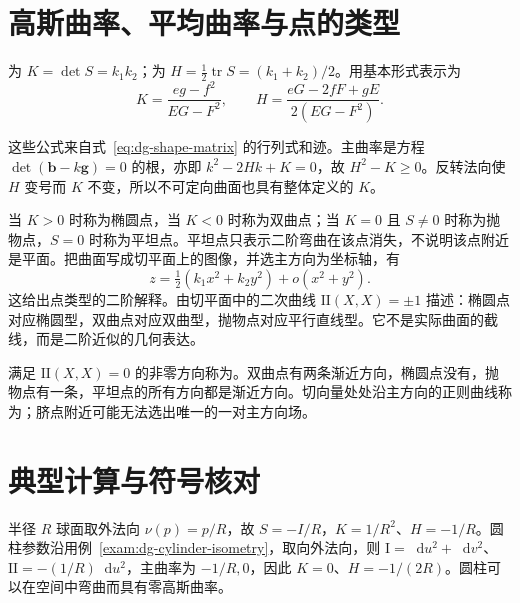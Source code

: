 \documentclass[UTF8,12pt,a4paper,fontset=fandol]{ctexbook}
\newcommand{\dd}{\mathop{}\!\mathrm d}
\DeclareMathOperator{\tr}{tr}
\begin{document}
\section{高斯曲率、平均曲率与点的类型}
\begin{definition}[高斯曲率与平均曲率]
为 $K=\det S=k_1k_2$；为 $H=\tfrac12\tr S=(k_1+k_2)/2$。用基本形式表示为
\begin{equation}
 K=\frac{eg-f^2}{EG-F^2},\qquad
 H=\frac{eG-2fF+gE}{2(EG-F^2)}.
 \label{eq:dg-KH}
\end{equation}
\end{definition}
这些公式来自式~\eqref{eq:dg-shape-matrix} 的行列式和迹。主曲率是方程 $\det(\mathbf b-k\mathbf g)=0$ 的根，亦即 $k^2-2Hk+K=0$，故 $H^2-K\ge0$。反转法向使 $H$ 变号而 $K$ 不变，所以不可定向曲面也具有整体定义的 $K$。

当 $K>0$ 时称为椭圆点，当 $K<0$ 时称为双曲点；当 $K=0$ 且 $S\ne0$ 时称为抛物点，$S=0$ 时称为平坦点。平坦点只表示二阶弯曲在该点消失，不说明该点附近是平面。把曲面写成切平面上的图像，并选主方向为坐标轴，有
\[
 z=\tfrac12(k_1x^2+k_2y^2)+o(x^2+y^2).
\]
这给出点类型的二阶解释。由切平面中的二次曲线 $\mathrm{II}(X,X)=\pm1$ 描述：椭圆点对应椭圆型，双曲点对应双曲型，抛物点对应平行直线型。它不是实际曲面的截线，而是二阶近似的几何表达。

满足 $\mathrm{II}(X,X)=0$ 的非零方向称为。双曲点有两条渐近方向，椭圆点没有，抛物点有一条，平坦点的所有方向都是渐近方向。切向量处处沿主方向的正则曲线称为；脐点附近可能无法选出唯一的一对主方向场。

\section{典型计算与符号核对}
\begin{example}[球面与圆柱]
半径 $R$ 球面取外法向 $\nu(p)=p/R$，故 $S=-I/R$，$K=1/R^2$、$H=-1/R$。圆柱参数沿用例~\ref{exam:dg-cylinder-isometry}，取向外法向，则 $\mathrm I=\dd u^2+\dd v^2$、$\mathrm{II}=-(1/R)\dd u^2$，主曲率为 $-1/R,0$，因此 $K=0$、$H=-1/(2R)$。圆柱可以在空间中弯曲而具有零高斯曲率。
\end{example}
\end{document}
